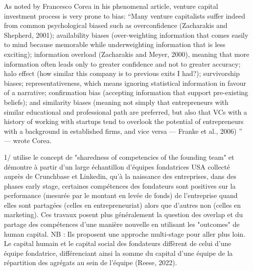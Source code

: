 \documentclass[12pt]{article}
\begin{document}
As noted by Francesco Corea in his phenomenal article, venture capital investment process is very prone to bias: “Many venture capitalists suffer indeed from common psychological biased such as overconfidence (Zacharakis and Shepherd, 2001); availability biases (over-weighting information that comes easily to mind because memorable while underweighting information that is less exciting); information overload (Zacharakis and Meyer, 2000), meaning that more information often leads only to greater confidence and not to greater accuracy; halo effect (how similar this company is to previous exits I had?); survivorship biases; representativeness, which means ignoring statistical information in favour of a narrative; confirmation bias (accepting information that support pre-existing beliefs); and similarity biases (meaning not simply that entrepreneurs with similar educational and professional path are preferred, but also that VCs with a history of working with startups tend to overlook the potential of entrepreneurs with a background in established firms, and vice versa — Franke et al., 2006) ” — wrote Corea.

1/ \citet{reese2020should} utilise le concept de "sharedness of competencies of the founding team" et démontre à partir d'un large échantillon d'équipes fondatrices USA collecté auprès de Crunchbase et Linkedin, qu'à la naissance des entreprises, dans des phases early stage, certaines compétences des fondateurs sont positives sur la performance (mesurée par le montant en levée de fonds) de l’entreprise quand elles sont partagées (celles en entrepreneuriat) alors que d’autres non (celles en marketing). Ces travaux posent plus généralement la question des overlap et du partage des compétences d'une manière nouvelle en utilisant les "outcomes" de human capital. NB : Ils proposent une approche multi-stage pour aller plus loin. Le capital humain et le capital social des fondateurs diffèrent de celui d'une équipe fondatrice, différenciant ainsi la somme du capital d'une équipe de la répartition des agrégats au sein de l'équipe (Reese, 2022).
\end{document}
